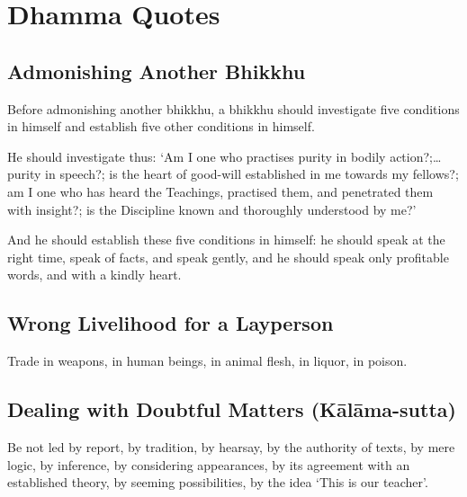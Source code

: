 \chapter{Dhamma Quotes}


\section*{Admonishing Another Bhikkhu}

Before admonishing another bhikkhu, a bhikkhu should investigate five conditions
in himself and establish five other conditions in himself.

He should investigate thus: ‘Am I one who practises purity in bodily action?;…
purity in speech?; is the heart of good-will established in me towards my
fellows?; am I one who has heard the Teachings, practised them, and penetrated
them with insight?; is the Discipline known and thoroughly understood by me?’

And he should establish these five conditions in himself: he should speak at the
right time, speak of facts, and speak gently, and he should speak only
profitable words, and with a kindly heart.


\section*{Wrong Livelihood for a Layperson}

Trade in weapons, in human beings, in animal flesh, in liquor, in poison.


\ifhandbookedition
\vspace*{-\baselineskip}
\fi

\section*{Dealing with Doubtful Matters (Kālāma-sutta)}

Be not led by report, by tradition, by hearsay, by the authority of texts, by
mere logic, by inference, by considering appearances, by its agreement with an
established theory, by seeming possibilities, by the idea ‘This is our teacher’.


\ifhandbookedition
\vspace*{-\baselineskip}
\fi

